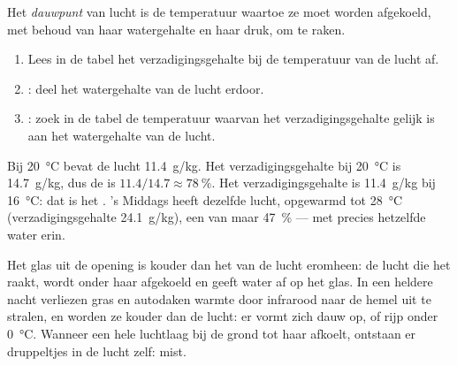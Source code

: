 \begin{definition}[Dauwpunt]\label{def:g10:why-clouds-form:dew-point}
Het \emph{dauwpunt} van lucht is de temperatuur waartoe ze moet
worden afgekoeld, met behoud van haar watergehalte en haar druk, om  te
raken.
\end{definition}

\begin{method}\label{met:g10:why-clouds-form:table}
\begin{enumerate}
  \item Lees in de tabel het verzadigingsgehalte bij de temperatuur van de lucht af.
  \item {}: deel het watergehalte van de lucht erdoor.
  \item {}: zoek in de tabel de temperatuur waarvan het
        verzadigingsgehalte gelijk is aan het watergehalte van de lucht.
\end{enumerate}
\end{method}

\begin{example}\label{ex:g10:why-clouds-form:morning}
Bij \qty{20}{\degreeCelsius} bevat de lucht \qty{11.4}{g/kg}. Het
verzadigingsgehalte bij \qty{20}{\degreeCelsius} is \qty{14.7}{g/kg}, dus de
 is $11.4/14.7 \approx \qty{78}{\percent}$. Het
verzadigingsgehalte is \qty{11.4}{g/kg} bij \qty{16}{\degreeCelsius}: dat is
het . 's Middags heeft dezelfde lucht, opgewarmd tot
\qty{28}{\degreeCelsius} (verzadigingsgehalte \qty{24.1}{g/kg}), een  van maar \qty{47}{\percent} --- met precies hetzelfde water erin.
\end{example}

Het glas uit de opening is kouder dan het  van de lucht eromheen: de
lucht die het raakt, wordt onder haar  afgekoeld en geeft water af op
het glas. In een heldere nacht verliezen gras en autodaken warmte door
infrarood naar de hemel uit te stralen, en worden ze kouder dan de lucht: er
vormt zich dauw op, of rijp onder \qty{0}{\degreeCelsius}. Wanneer een hele
luchtlaag bij de grond tot haar  afkoelt, ontstaan er druppeltjes in de
lucht zelf: mist.

